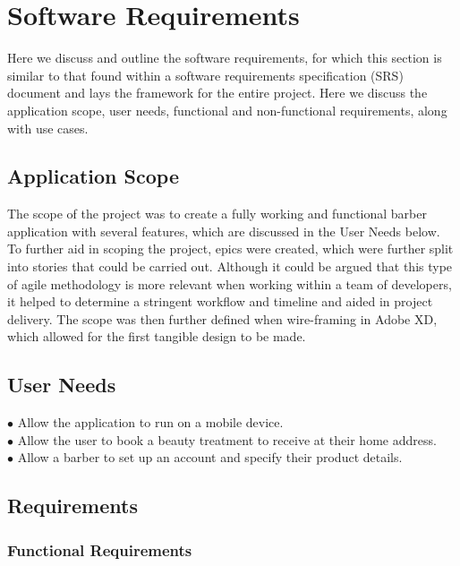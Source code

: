 \documentclass[12pt]{article}
\begin{document}
		

	\section{Software Requirements}
	Here we discuss and outline the software requirements, for which this section is similar to that found within a software requirements specification (SRS) document and lays the framework for the entire project. Here we discuss the application scope, user needs, functional and non-functional requirements, along with use cases.
	

	\subsection{Application Scope}
	The scope of the project was to create a fully working and functional barber application with several features, which are discussed in the User Needs below. To further aid in scoping the project, epics were created, which were further split into stories that could be carried out. Although it could be argued that this type of agile methodology is more relevant when working within a team of developers, it helped to determine a stringent workflow and timeline and aided in project delivery.
	The scope was then further defined when wire-framing in Adobe XD, which allowed for the first tangible design to be made.
	
	\subsection{User Needs}
	$\bullet$ Allow the application to run on a mobile device.
	\\
	$\bullet$ Allow the user to book a beauty treatment to receive at their home address.
	\\
	$\bullet$ Allow a barber to set up an account and specify their product details.

	\subsection{Requirements}
	\subsubsection{Functional Requirements}
	
\end{document}
